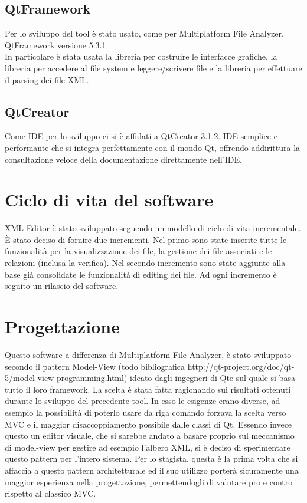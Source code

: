 	\subsection{Qt\textregistered Framework}
		Per lo sviluppo del tool è stato usato, come per Multiplatform File Analyzer, Qt\textregistered Framework versione 5.3.1.\\
		In particolare è stata usata la libreria per costruire le interfacce grafiche, la libreria per accedere al file system e leggere/scrivere file e la libreria per effettuare il parsing dei file XML.
	
	\subsection{Qt\textregistered Creator}
		Come IDE per lo sviluppo ci si è affidati a Qt\textregistered Creator 3.1.2. IDE semplice e performante che si integra perfettamente con il mondo Qt\textregistered, offrendo addirittura la consultazione veloce della documentazione direttamente nell'IDE.
	
	\section{Ciclo di vita del software}
		XML Editor è stato sviluppato seguendo un modello di ciclo di vita incrementale. È stato deciso di fornire due incrementi. Nel primo sono state inserite tutte le funzionalità per la visualizzazione dei file, la gestione dei file associati e le relazioni (inclusa la verifica). Nel secondo incremento sono state aggiunte alla base già consolidate le funzionalità di editing dei file. Ad ogni incremento è seguito un rilascio del software.

\section{Progettazione}
	Questo software a differenza di Multiplatform File Analyzer, è stato sviluppato secondo il pattern Model-View (todo bibliografica http://qt-project.org/doc/qt-5/model-view-programming.html) ideato dagli ingegneri di Qt\textregistered e sul quale si basa tutto il loro framework. La scelta è stata fatta ragionando sui risultati ottenuti durante lo sviluppo del precedente tool. In esso le esigenze erano diverse, ad esempio la possibilità di poterlo usare da riga comando forzava la scelta verso MVC e il maggior disaccoppiamento possibile dalle classi di Qt\textregistered. Essendo invece questo un editor visuale, che si sarebbe andato a basare proprio sul meccanismo di model-view per gestire ad esempio l'albero XML, si è deciso di sperimentare questo pattern per l'intero sistema. Per lo stagista, questa è la prima volta che si affaccia a questo pattern architetturale ed il suo utilizzo porterà sicuramente una maggior esperienza nella progettazione, permettendogli di valutare pro e contro rispetto al classico MVC.


